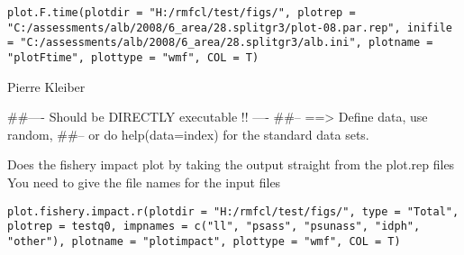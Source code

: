\documentclass[a4paper]{book}
\begin{document}
%
\begin{Usage}
\begin{verbatim}
plot.F.time(plotdir = "H:/rmfcl/test/figs/", plotrep = "C:/assessments/alb/2008/6_area/28.splitgr3/plot-08.par.rep", inifile = "C:/assessments/alb/2008/6_area/28.splitgr3/alb.ini", plotname = "plotFtime", plottype = "wmf", COL = T)
\end{verbatim}
\end{Usage}
%
\begin{Arguments}
\begin{ldescription}
\item[\code{plotdir}] 


\item[\code{plotrep}] 


\item[\code{inifile}] 


\item[\code{plotname}] 


\item[\code{plottype}] 


\item[\code{COL}] 


\end{ldescription}
\end{Arguments}
%
\begin{Author}\relax

Pierre Kleiber
\end{Author}
%
\begin{Examples}
\begin{ExampleCode}
##---- Should be DIRECTLY executable !! ----
##-- ==>  Define data, use random,
##--	or do  help(data=index)  for the standard data sets.

\end{ExampleCode}
\end{Examples}
%
\begin{Description}\relax

Does the fishery impact plot by taking the output straight from the plot.rep files
You need to give the file names for the input files
\end{Description}
%
\begin{Usage}
\begin{verbatim}
plot.fishery.impact.r(plotdir = "H:/rmfcl/test/figs/", type = "Total", plotrep = testq0, impnames = c("ll", "psass", "psunass", "idph", "other"), plotname = "plotimpact", plottype = "wmf", COL = T)
\end{verbatim}
\end{Usage}
\end{document}
